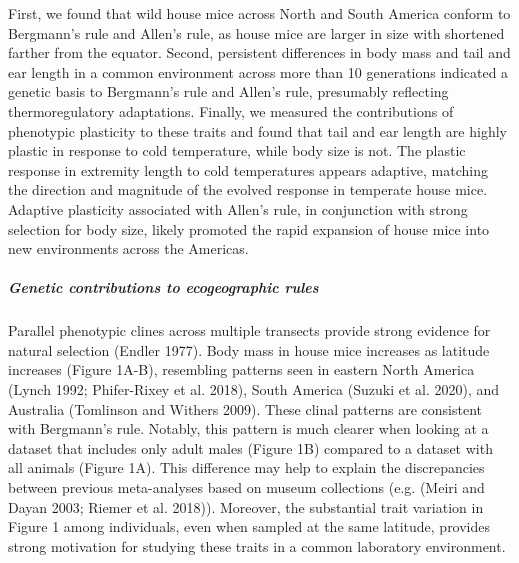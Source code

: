 \documentclass[]{article}
\let\oldsubparagraph\subparagraph
\renewcommand{\subparagraph}[1]{\oldsubparagraph{#1}\mbox{}}
\begin{document}
First, we found that wild house mice across North and South America
conform to Bergmann's rule and Allen's rule, as house mice are larger in
size with shortened farther from the equator. Second, persistent
differences in body mass and tail and ear length in a common environment
across more than 10 generations indicated a genetic basis to Bergmann's
rule and Allen's rule, presumably reflecting thermoregulatory
adaptations. Finally, we measured the contributions of phenotypic
plasticity to these traits and found that tail and ear length are highly
plastic in response to cold temperature, while body size is not. The
plastic response in extremity length to cold temperatures appears
adaptive, matching the direction and magnitude of the evolved response
in temperate house mice. Adaptive plasticity associated with Allen's
rule, in conjunction with strong selection for body size, likely
promoted the rapid expansion of house mice into new environments across
the Americas.

\vspace{2.5mm}

\hypertarget{genetic-contributions-to-ecogeographic-rules}{%
\subparagraph{\texorpdfstring{\emph{Genetic contributions to
ecogeographic
rules}}{Genetic contributions to ecogeographic rules}}\label{genetic-contributions-to-ecogeographic-rules}}

Parallel phenotypic clines across multiple transects provide strong
evidence for natural selection (Endler 1977). Body mass in house mice
increases as latitude increases (Figure 1A-B), resembling patterns seen
in eastern North America (Lynch 1992; Phifer-Rixey et al. 2018), South
America (Suzuki et al. 2020), and Australia (Tomlinson and Withers
2009). These clinal patterns are consistent with Bergmann's rule.
Notably, this pattern is much clearer when looking at a dataset that
includes only adult males (Figure 1B) compared to a dataset with all
animals (Figure 1A). This difference may help to explain the
discrepancies between previous meta-analyses based on museum collections
(e.g. (Meiri and Dayan 2003; Riemer et al. 2018)). Moreover, the
substantial trait variation in Figure 1 among individuals, even when
sampled at the same latitude, provides strong motivation for studying
these traits in a common laboratory environment.
\end{document}
